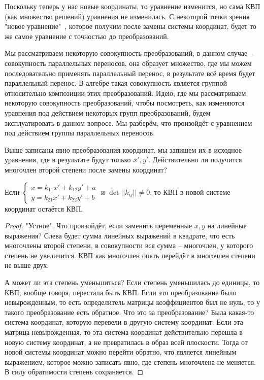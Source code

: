  Поскольку теперь у нас новые координаты, то уравнение изменится, но сама КВП (как множество решений) уравнения не изменилась.
 С некоторой точки зрения "новое уравнение"\ , которое получим после замены системы координат, будет то же самое уравнение с точностью до преобразований.

 Мы рассматриваем некоторую совокупность преобразований, в данном случае -- совокупность параллельных переносов, она образует множество, где мы можем последовательно применять параллельный перенос, в результате всё время будет параллельный перенос. 
 В алгебре такая совокупность является группой относительно композиции этих преобразований.
 Идею, где мы рассматриваем некоторую совокупность преобразований, чтобы посмотреть, как изменяются уравнения под действием некоторых групп преобразований, будем эксплуатировать в данном вопросе.
 Мы разберём, что произойдёт с уравнением под действием группы параллельных переносов.

 Выше записаны явно преобразования координат, мы запишем их в исходное уравнения, где в результате будут только $x', y'$.
 Действительно ли получится многочлен второй степени после замены координат? 

 \begin{Prop}
	 Если $\begin{cases}
		 x = k_{11}x' + k_{12}y' + a\\
		 y = k_{21}x' + k_{22}y' + b
	 \end{cases}$ и $ \det ||k_{ij}|| \neq 0$, то КВП в новой системе координат остаётся КВП.
 \end{Prop}

 \begin{proof}
	 "Устное". Что произойдёт, если заменить переменные $x, y$ на линейные выражения? Слева будет сумма линейных выражений в квадрате, что есть многочлены второй степени, в совокупности вся сумма -- многочлен, у которого степень не увеличится.
	КВП как многочлен опять перейдёт в многочлен степени не выше двух.

	А может ли эта степень уменьшиться? Если степень уменьшилась до единицы, то КВП, вообще говоря, перестала быть КВП. Если это преобразование было невырожденным, то есть определитель матрицы коэффициентов был не нуль, то у такого преобразование есть обратное.
	Что это за преобразование? Была какая-то система координат, которую перевели в другую систему координат. Если эта матрица невырожденная, то эта система координат действительно перешла в новую систему координат, а не превратилась в образ всей плоскости. 
	Тогда от новой системы координат можно перейти обратно, что является линейным выражением, которое можно записать явно, где степень многочлена не меняется.
	В силу обратимости степень сохраняется.
\end{proof}

